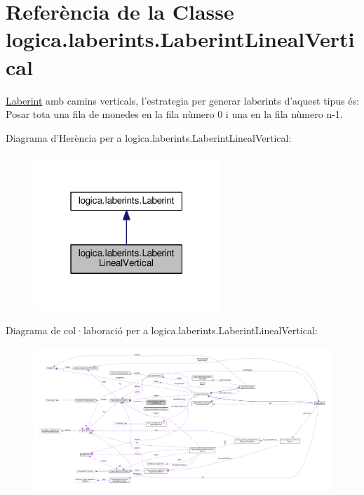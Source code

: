 \hypertarget{classlogica_1_1laberints_1_1_laberint_lineal_vertical}{\section{Referència de la Classe logica.\+laberints.\+Laberint\+Lineal\+Vertical}
\label{classlogica_1_1laberints_1_1_laberint_lineal_vertical}
}


\hyperlink{classlogica_1_1laberints_1_1_laberint}{Laberint} amb camins verticals, l'estrategia per generar laberints d'aquest tipus és\+: Posar tota una fila de monedes en la fila nùmero 0 i una en la fila nùmero n-\/1.  




Diagrama d'Herència per a logica.\+laberints.\+Laberint\+Lineal\+Vertical\+:
\nopagebreak
\begin{figure}[H]
\begin{center}
\leavevmode
\includegraphics[width=199pt]{classlogica_1_1laberints_1_1_laberint_lineal_vertical__inherit__graph}
\end{center}
\end{figure}


Diagrama de col·laboració per a logica.\+laberints.\+Laberint\+Lineal\+Vertical\+:
\nopagebreak
\begin{figure}[H]
\begin{center}
\leavevmode
\includegraphics[width=350pt]{classlogica_1_1laberints_1_1_laberint_lineal_vertical__coll__graph}
\end{center}
\end{figure}
